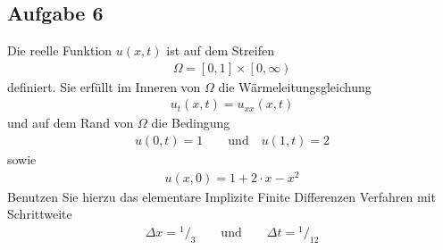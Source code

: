 \documentclass[
	final,
	a4paper,
	oneside,
	parskip=full,
	headings=standardclasses,
	headings=big,
	pointednumbers
]{scrartcl}
\begin{document}
    \subsection*{Aufgabe 6}
    Die reelle Funktion $u{\left(x,  t\right)}$ ist auf dem Streifen
    \begin{align*}
        \Omega = \left[ 0, 1 \right] \times \left[ 0, \infty \right)
    \end{align*}
    definiert. Sie erfüllt im Inneren von $\Omega$ die Wärmeleitungsgleichung
    \begin{align*}
        u_t{\left(x,  t\right)} = u_{xx}{\left(x,  t\right)}
    \end{align*}
    und auf dem Rand von $\Omega$ die Bedingung
    \begin{align*}
        u{\left(0,  t\right)} = 1 \qquad \text{und} \quad u{\left(1,  t\right)} = 2
    \end{align*}
    sowie
    \begin{align*}
        u{\left(x,  0\right)} = 1 + 2 \cdot x - x^2
    \end{align*}
    Benutzen Sie hierzu das elementare Implizite Finite Differenzen Verfahren mit Schrittweite
    \begin{align*}
        \Delta{x} = {^1/_3} \qquad \text{und} \qquad \Delta{t} = {^1/_{12}}
    \end{align*}
\end{document}
